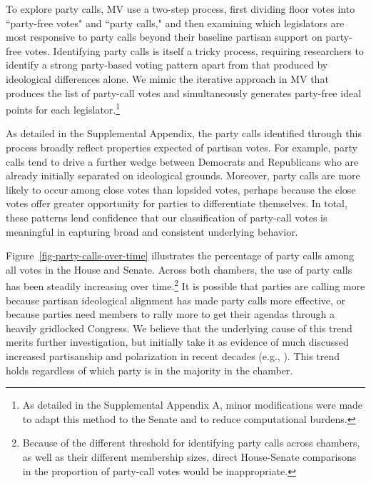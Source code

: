 \documentclass[12pt]{article}
\begin{document}
To explore party calls, MV use a two-step process, first dividing floor votes into ``party-free votes" and ``party calls," and then examining which legislators are most responsive to party calls beyond their baseline partisan support on party-free votes. Identifying party calls is itself a tricky process, requiring researchers to identify a strong party-based voting pattern apart from that produced by ideological differences alone. We mimic the iterative approach in MV that produces the list of party-call votes and simultaneously generates party-free ideal points for each legislator.\footnote{\doublespacing\normalsize As detailed in the Supplemental Appendix A, minor modifications were made to adapt this method to the Senate and to reduce computational burdens.}

As detailed in the Supplemental Appendix, the party calls identified through this process broadly reflect properties expected of partisan votes. For example, party calls tend to drive a further wedge between Democrats and Republicans who are already initially separated on ideological grounds. Moreover, party calls are more likely to occur among close votes than lopsided votes, perhaps because the close votes offer greater opportunity for parties to differentiate themselves.  In total, these patterns lend confidence that our classification of party-call votes is meaningful in capturing broad and consistent underlying behavior.

Figure~\ref{fig-party-calls-over-time} illustrates the percentage of party calls among all votes in the House and Senate. Across both chambers, the use of party calls has been steadily increasing over time.\footnote{\doublespacing\normalsize Because of the different threshold for identifying party calls across chambers, as well as their different membership sizes, direct House-Senate comparisons in the proportion of party-call votes would be inappropriate.} It is possible that parties are calling more because partisan ideological alignment has made party calls more effective, or because parties need members to rally more to get their agendas through a heavily gridlocked Congress. We believe that the underlying cause of this trend merits further investigation, but initially take it as evidence of much discussed increased partisanship and polarization in recent decades (e.g.,  \cite{Aldrich:2000, Lee:2009, Lee:2016, Theriault:2013, Smith:2014}). This trend holds regardless of which party is in the majority in the chamber.
\end{document}
